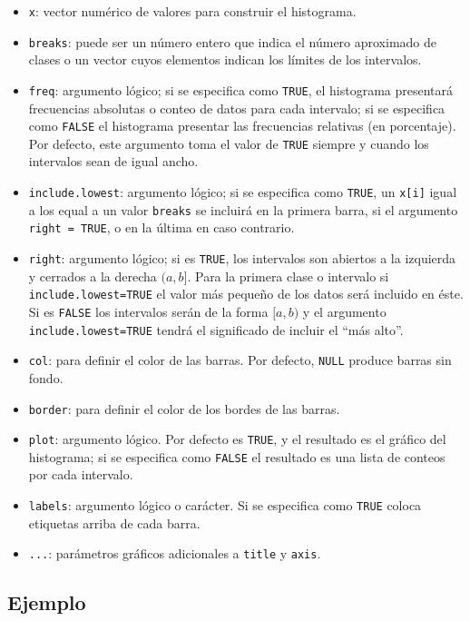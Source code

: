 \documentclass[10pt,]{krantz}
\providecommand{\tightlist}{%
  \setlength{\itemsep}{0pt}\setlength{\parskip}{0pt}}
\begin{document}
\begin{itemize}
\tightlist
\item
  \texttt{x}: vector numérico de valores para construir el histograma.
\item
  \texttt{breaks}: puede ser un número entero que indica el número
  aproximado de clases o un vector cuyos elementos indican los límites
  de los intervalos.
\item
  \texttt{freq}: argumento lógico; si se especifica como \texttt{TRUE},
  el histograma presentará frecuencias absolutas o conteo de datos para
  cada intervalo; si se especifica como \texttt{FALSE} el histograma
  presentar las frecuencias relativas (en porcentaje). Por defecto, este
  argumento toma el valor de \texttt{TRUE} siempre y cuando los
  intervalos sean de igual ancho.
\item
  \texttt{include.lowest}: argumento lógico; si se especifica como
  \texttt{TRUE}, un \texttt{x{[}i{]}} igual a los equal a un valor
  \texttt{breaks} se incluirá en la primera barra, si el argumento
  \texttt{right\ =\ TRUE}, o en la última en caso contrario.
\item
  \texttt{right}: argumento lógico; si es \texttt{TRUE}, los intervalos
  son abiertos a la izquierda y cerrados a la derecha \((a,b]\). Para la
  primera clase o intervalo si \texttt{include.lowest=TRUE} el valor más
  pequeño de los datos será incluido en éste. Si es \texttt{FALSE} los
  intervalos serán de la forma \([a,b)\) y el argumento
  \texttt{include.lowest=TRUE} tendrá el significado de incluir el ``más
  alto''.
\item
  \texttt{col}: para definir el color de las barras. Por defecto,
  \texttt{NULL} produce barras sin fondo.
\item
  \texttt{border}: para definir el color de los bordes de las barras.
\item
  \texttt{plot}: argumento lógico. Por defecto es \texttt{TRUE}, y el
  resultado es el gráfico del histograma; si se especifica como
  \texttt{FALSE} el resultado es una lista de conteos por cada
  intervalo.
\item
  \texttt{labels}: argumento lógico o carácter. Si se especifica como
  \texttt{TRUE} coloca etiquetas arriba de cada barra.
\item
  \texttt{...}: parámetros gráficos adicionales a \texttt{title} y
  \texttt{axis}.
\end{itemize}

\subsection*{Ejemplo}\label{ejemplo-2}
\end{document}
